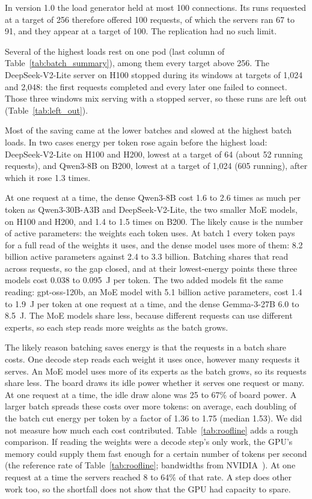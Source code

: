 \documentclass[11pt]{article}
\begin{document}
In version 1.0 the load generator held at most 100 connections. Its runs requested at a target of 256 therefore offered 100 requests, of which the servers ran 67 to 91, and they appear at a target of 100. The replication had no such limit.



Several of the highest loads rest on one pod (last column of Table~\ref{tab:batch_summary}), among them every target above 256. The DeepSeek-V2-Lite server on H100 stopped during its windows at targets of 1,024 and 2,048: the first requests completed and every later one failed to connect. Those three windows mix serving with a stopped server, so these runs are left out (Table~\ref{tab:left_out}).

Most of the saving came at the lower batches and slowed at the highest batch loads. In two cases energy per token rose again before the highest load: DeepSeek-V2-Lite on H100 and H200, lowest at a target of 64 (about 52 running requests), and Qwen3-8B on B200, lowest at a target of 1,024 (605 running), after which it rose 1.3 times.

At one request at a time, the dense Qwen3-8B cost 1.6 to 2.6 times as much per token as Qwen3-30B-A3B and DeepSeek-V2-Lite, the two smaller MoE models, on H100 and H200, and 1.4 to 1.5 times on B200. The likely cause is the number of active parameters: the weights each token uses. At batch 1 every token pays for a full read of the weights it uses, and the dense model uses more of them: 8.2 billion active parameters against 2.4 to 3.3 billion. Batching shares that read across requests, so the gap closed, and at their lowest-energy points these three models cost 0.038 to 0.095~J per token. The two added models fit the same reading: gpt-oss-120b, an MoE model with 5.1 billion active parameters, cost 1.4 to 1.9~J per token at one request at a time, and the dense Gemma-3-27B 6.0 to 8.5~J. The MoE models share less, because different requests can use different experts, so each step reads more weights as the batch grows.

The likely reason batching saves energy is that the requests in a batch share costs. One decode step reads each weight it uses once, however many requests it serves. An MoE model uses more of its experts as the batch grows, so its requests share less. The board draws its idle power whether it serves one request or many. At one request at a time, the idle draw alone was 25 to 67\% of board power. A larger batch spreads these costs over more tokens: on average, each doubling of the batch cut energy per token by a factor of 1.36 to 1.75 (median 1.53). We did not measure how much each cost contributed. Table~\ref{tab:roofline} adds a rough comparison. If reading the weights were a decode step's only work, the GPU's memory could supply them fast enough for a certain number of tokens per second (the reference rate of Table~\ref{tab:roofline}; bandwidths from NVIDIA~\citep{nvidia_specs}). At one request at a time the servers reached 8 to 64\% of that rate. A step does other work too, so the shortfall does not show that the GPU had capacity to spare.
\end{document}

